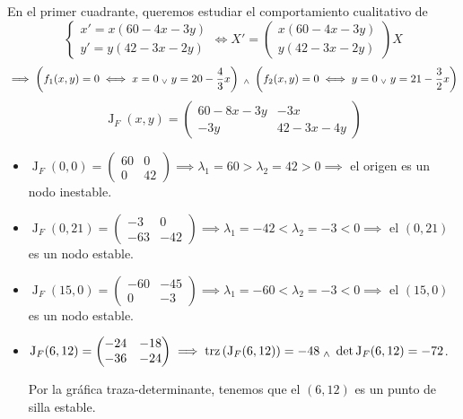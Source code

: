\begin{ejem}
	En el primer cuadrante, queremos estudiar el comportamiento cualitativo de
	\[\begin{cases}
			x' = x(60-4x-3y) \\y ' = y (42 - 3x-2y)
		\end{cases}\iff X' = \begin{pmatrix}
			x(60-4x-3y) \\y (42-3x-2y)
		\end{pmatrix} X\]
	\[\implies \left(f_1 (x,y) = 0 \iff x = 0 \; _{\vee} \; y = 20 - \frac{4}{3}x \right) \; _{\wedge} \; \left(f_2 (x,y) = 0 \iff y = 0 \; _{\vee} \; y = 21 - \frac{3}{2}x \right)\]
	\[\operatorname{J}_F(x,y) = \begin{pmatrix}
			60 - 8x - 3y & -3x          \\
			-3y          & 42 - 3x - 4y
		\end{pmatrix}\]
	\begin{itemize}
		\item $\operatorname{J}_F(0,0) = \begin{pmatrix}
				      60 & 0  \\
				      0  & 42
			      \end{pmatrix} \implies \lambda_1 = 60 > \lambda_2 = 42 > 0 \implies$ el origen es un nodo inestable.
		\item $\operatorname{J}_F(0, 21) = \begin{pmatrix}
				      -3  & 0   \\
				      -63 & -42
			      \end{pmatrix} \implies \lambda_1 = -42 < \lambda_2 = -3 < 0 \implies$ el $(0, 21)$ es un nodo estable.
		\item $\operatorname{J}_F(15, 0) = \begin{pmatrix}
				      -60 & -45 \\
				      0   & -3
			      \end{pmatrix} \implies \lambda_1 = -60 < \lambda_2 = -3 < 0 \implies$ el $(15, 0)$ es un nodo estable.
		\item $\operatorname{J}_F(6, 12) = \begin{pmatrix}
				      -24 & -18 \\
				      -36 & -24
			      \end{pmatrix} \implies \operatorname{trz}\left(\operatorname{J}_F(6, 12)\right) = -48 \; _{\wedge} \; \det{\operatorname{J}_F(6, 12)} = -72$.

		      Por la gráfica traza-determinante, tenemos que el $(6, 12)$ es un punto de silla estable.
	\end{itemize}
\end{ejem}

